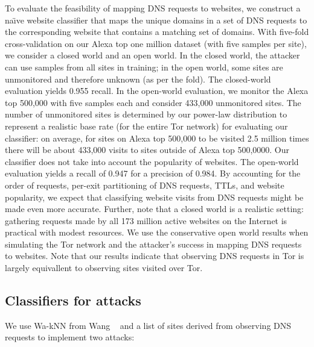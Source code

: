 To evaluate the feasibility of mapping DNS requests to websites, we
construct a na\"{\i}ve website classifier that maps the unique domains
in a set of DNS requests to the corresponding website that contains a
matching set of domains.  With five-fold cross-validation on our Alexa
top one million dataset (with five samples per site),
we consider a closed world and an open world.
In the closed world, the attacker can use samples
from all sites in training; in the open world, some sites
are unmonitored and therefore unknown (as per the fold).  The
closed-world evaluation yields 0.955 recall.  In the open-world
evaluation, we monitor the Alexa top 500,000 with five samples each and
consider 433,000 unmonitored sites.  The number of unmonitored sites is
determined by our power-law
distribution to represent a realistic base rate (for the entire Tor network)
for evaluating our classifier: on average, for sites on Alexa top 500,000
to be visited 2.5 million times there will be about 433,000 visits to sites
outside of Alexa top 500,0000.  Our classifier does not take into account the
popularity of websites.
The open-world evaluation yields a
recall of 0.947 for a precision of 0.984.  By accounting for the order
of requests, per-exit partitioning of DNS requests, TTLs, and website
popularity, we expect that classifying website visits from DNS requests
might be made even more accurate.
Further, note that a closed world is a realistic setting:
gathering requests made by all 173 million active websites on the
Internet is practical with modest resources.
We use the conservative open world results when simulating the Tor network and
the attacker's success in mapping DNS requests to websites.
Note that our results indicate that observing DNS requests in Tor is
largely equivallent to observing sites visited over Tor.

\subsection{Classifiers for \name attacks}

We use Wa-kNN from Wang \ea~\cite{Wang2014a} and a list of sites derived from
observing DNS requests to implement two attacks:

